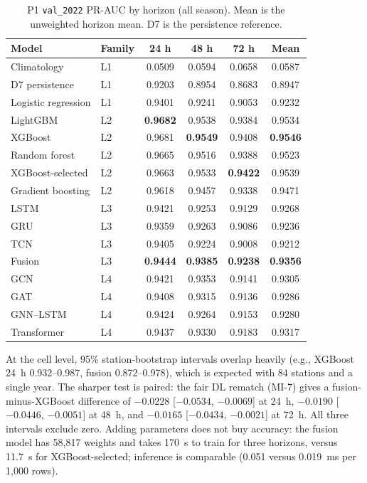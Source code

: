 \documentclass[conference]{IEEEtran}
\newcommand{\best}[1]{\textbf{#1}}
\begin{document}
\begin{table}[t]
\centering
\caption{P1 \texttt{val\_2022} PR-AUC by horizon (all season). Mean is the unweighted horizon mean. D7 is the persistence reference.}
\label{tab:mldl}
\scriptsize
\setlength{\tabcolsep}{3.2pt}
\begin{tabular}{l l c c c c}
\toprule
Model & Family & 24 h & 48 h & 72 h & Mean \\
\midrule
Climatology & L1 & 0.0509 & 0.0594 & 0.0658 & 0.0587 \\
D7 persistence & L1 & 0.9203 & 0.8954 & 0.8683 & 0.8947 \\
Logistic regression & L1 & 0.9401 & 0.9241 & 0.9053 & 0.9232 \\
\midrule
LightGBM & L2 & \best{0.9682} & 0.9538 & 0.9384 & 0.9534 \\
XGBoost & L2 & 0.9681 & \best{0.9549} & 0.9408 & \best{0.9546} \\
Random forest & L2 & 0.9665 & 0.9516 & 0.9388 & 0.9523 \\
XGBoost-selected & L2 & 0.9663 & 0.9533 & \best{0.9422} & 0.9539 \\
Gradient boosting & L2 & 0.9618 & 0.9457 & 0.9338 & 0.9471 \\
\midrule
LSTM & L3 & 0.9421 & 0.9253 & 0.9129 & 0.9268 \\
GRU & L3 & 0.9359 & 0.9263 & 0.9086 & 0.9236 \\
TCN & L3 & 0.9405 & 0.9224 & 0.9008 & 0.9212 \\
Fusion & L3 & \best{0.9444} & \best{0.9385} & \best{0.9238} & \best{0.9356} \\
GCN & L4 & 0.9421 & 0.9353 & 0.9141 & 0.9305 \\
GAT & L4 & 0.9408 & 0.9315 & 0.9136 & 0.9286 \\
GNN--LSTM & L4 & 0.9424 & 0.9264 & 0.9153 & 0.9280 \\
Transformer & L4 & 0.9437 & 0.9330 & 0.9183 & 0.9317 \\
\bottomrule
\end{tabular}
\end{table}

At the cell level, 95\% station-bootstrap intervals overlap heavily (e.g., XGBoost 24~h 0.932--0.987, fusion 0.872--0.978), which is expected with 84 stations and a single year. The sharper test is paired: the fair DL rematch (MI-7) gives a fusion-minus-XGBoost difference of $-0.0228$ [$-0.0534$, $-0.0069$] at 24~h, $-0.0190$ [$-0.0446$, $-0.0051$] at 48~h, and $-0.0165$ [$-0.0434$, $-0.0021$] at 72~h. All three intervals exclude zero. Adding parameters does not buy accuracy: the fusion model has 58{,}817 weights and takes 170~s to train for three horizons, versus 11.7~s for XGBoost-selected; inference is comparable (0.051 versus 0.019~ms per 1{,}000 rows).
\end{document}
